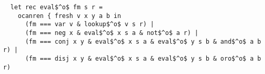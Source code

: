 \begin{lstlisting}
  let rec eval$^o$ fm s r =
    ocanren { fresh v x y a b in
      (fm === var v & lookup$^o$ v s r) |
      (fm === neg x & eval$^o$ x s a & not$^o$ a r) |
      (fm === conj x y & eval$^o$ x s a & eval$^o$ y s b & and$^o$ a b r) |
      (fm === disj x y & eval$^o$ x s a & eval$^o$ y s b & oro$^o$ a b r)
  \end{lstlisting}